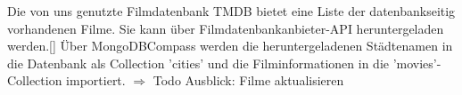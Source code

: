 \noindent
Die von uns genutzte Filmdatenbank TMDB bietet eine Liste der datenbankseitig vorhandenen Filme. Sie kann über Filmdatenbankanbieter-API heruntergeladen werden.[]
\newline
Über MongoDBCompass werden die heruntergeladenen Städtenamen in die Datenbank als Collection 'cities' und die Filminformationen in die 'movies'-Collection importiert.
\newline
$\Rightarrow$ Todo Ausblick: Filme aktualisieren

